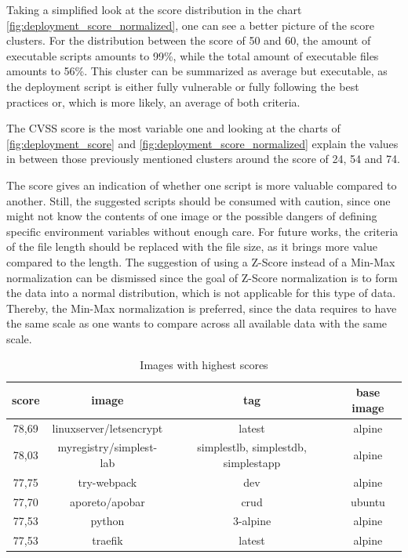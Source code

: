 Taking a simplified look at the score distribution in the chart \ref{fig:deployment_score_normalized}, one can see a better picture of the score clusters. For the distribution between the score of 50 and 60, the amount of executable scripts amounts to 99\%, while the total amount of executable files amounts to 56\%. This cluster can be summarized as average but executable, as the deployment script is either fully vulnerable or fully following the best practices or, which is more likely, an average of both criteria.

The CVSS score is the most variable one and looking at the charts of \ref{fig:deployment_score} and \ref{fig:deployment_score_normalized} explain the values in between those previously mentioned clusters around the score of 24, 54 and 74.

The score gives an indication of whether one script is more valuable compared to another. Still, the suggested scripts should be consumed with caution, since one might not know the contents of one image or the possible dangers of defining specific environment variables without enough care.
For future works, the criteria of the file length should be replaced with the file size, as it brings more value compared to the length. The suggestion of using a Z-Score instead of a Min-Max normalization can be dismissed since the goal of Z-Score normalization is to form the data into a normal distribution, which is not applicable for this type of data. Thereby, the Min-Max normalization is preferred, since the data requires to have the same scale as one wants to compare across all available data with the same scale.

\begin{table}[h!]
    \centering
    \begin{tabular}{ |c|c|c|c| }
    \hline
    score & image & tag & base image \\
    \hline
         78,69 & linuxserver/letsencrypt & latest & alpine \\
         78,03 & myregistry/simplest-lab & simplestlb, simplestdb, simplestapp & alpine \\
         77,75 & try-webpack & dev & alpine\\
         77,70 & aporeto/apobar & crud & ubuntu \\
         77,53 & python & 3-alpine & alpine\\
         77,53 & traefik & latest & alpine\\
    \hline
    \end{tabular}
    \caption{Images with highest scores}
    \label{images_with_highest_score}
\end{table}

